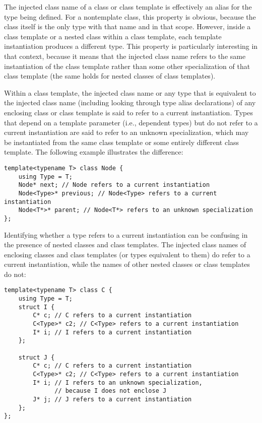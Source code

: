 The injected class name of a class or class template is effectively an alias for the type being defined. For a nontemplate class, this property is obvious, because the class itself is the only type with that name and in that scope. However, inside a class template or a nested class within a class template, each template instantiation produces a different type. This property is particularly interesting in that context, because it means that the injected class name refers to the same instantiation of the class template rather than some other specialization of that class template (the same holds for nested classes of class templates).

Within a class template, the injected class name or any type that is equivalent to the injected class name (including looking through type alias declarations) of any enclosing class or class template is said to refer to a current instantiation. Types that depend on a template parameter (i.e., dependent types) but do not refer to a current instantiation are said to refer to an unknown specialization, which may be instantiated from the same class template or some entirely different class template. The following example illustrates the difference:

\begin{lstlisting}[style=styleCXX]
template<typename T> class Node {
	using Type = T;
	Node* next; // Node refers to a current instantiation
	Node<Type>* previous; // Node<Type> refers to a current instantiation
	Node<T*>* parent; // Node<T*> refers to an unknown specialization
};
\end{lstlisting}

Identifying whether a type refers to a current instantiation can be confusing in the presence of nested classes and class templates. The injected class names of enclosing classes and class templates (or types equivalent to them) do refer to a current instantiation, while the names of other nested classes or class templates do not:

\begin{lstlisting}[style=styleCXX]
template<typename T> class C {
	using Type = T;
	struct I {
		C* c; // C refers to a current instantiation
		C<Type>* c2; // C<Type> refers to a current instantiation
		I* i; // I refers to a current instantiation
	};

	struct J {
		C* c; // C refers to a current instantiation
		C<Type>* c2; // C<Type> refers to a current instantiation
		I* i; // I refers to an unknown specialization,
			  // because I does not enclose J
		J* j; // J refers to a current instantiation
	};
};
\end{lstlisting}

